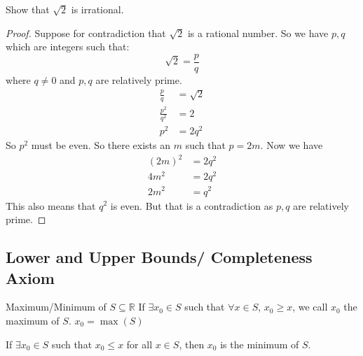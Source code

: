 \documentclass{report}
\begin{document}
\begin{examples}
    \begin{example}
        Show that $\sqrt{2}$ is irrational.
            \begin{proof}
                Suppose for contradiction that $\sqrt{2}$ is a rational number. So we have $p, q$ which are integers such that:
                    \begin{equation*}
                        \sqrt{2} = \frac{p}{q}
                    \end{equation*}
                where $q \neq 0$ and $p, q$ are relatively prime. 
                    \begin{align*}
                        \frac{p}{q}         &= \sqrt{2} \\
                        \frac{p^{2}}{q^{2}} &= 2        \\
                        p^{2}               &= 2q^{2}     
                    \end{align*}
                So $p^{2}$ must be even. So there exists an $m$ such that $p = 2m$. Now we have
                    \begin{align*}
                        (2m)^{2} &= 2q^{2} \\
                        4m^{2}   &= 2q^{2} \\
                        2m^{2}   &= q^{2}    
                    \end{align*}
                This also means that $q^{2}$ is even. But that is a contradiction as $p, q$ are relatively prime.
            \end{proof}
    \end{example}
\end{examples}

\begin{topic}
    \section{Lower and Upper Bounds/ Completeness Axiom}
\end{topic}

\begin{definition}{Maximum/Minimum of $S \subseteq \mathbb{R}$}
    If $\exists x_{0} \in S$ such that $\forall x \in S$, $x_{0} \geq  x$, we call $x_{0}$ the maximum of $S$. $x_{0} = \max(S) $

    If $\exists x_{0} \in S$ such that $x_{0} \leq x$ for all $x \in S$, then $x_{0}$ is the minimum of $S$.
\end{definition}
\end{document}
